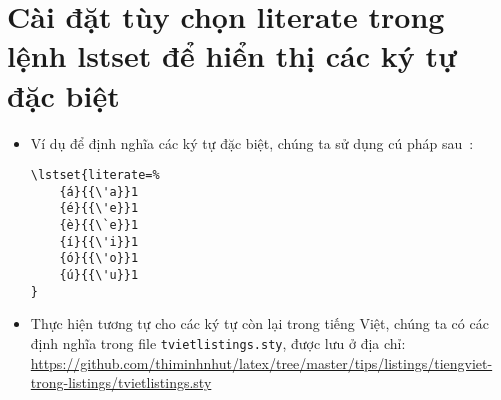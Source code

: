 \documentclass[12pt,a4paper]{article}
\begin{document}
\section{Cài đặt tùy chọn literate trong lệnh lstset để hiển thị các ký tự đặc biệt}
	\begin{itemize}
		\item Ví dụ để định nghĩa các ký tự đặc biệt, chúng ta sử dụng cú pháp sau~\cite{listings-stackexchange}:
\begin{lstlisting}
\lstset{literate=%
    {á}{{\'a}}1 
    {é}{{\'e}}1
    {è}{{\`e}}1
    {í}{{\'i}}1
    {ó}{{\'o}}1
    {ú}{{\'u}}1
}
\end{lstlisting}

		\item Thực hiện tương tự cho các ký tự còn lại trong tiếng Việt, chúng ta có các định nghĩa trong file \verb|tvietlistings.sty|, được lưu ở địa chỉ: \url{https://github.com/thiminhnhut/latex/tree/master/tips/listings/tiengviet-trong-listings/tvietlistings.sty}
	\end{itemize}
\end{document}
